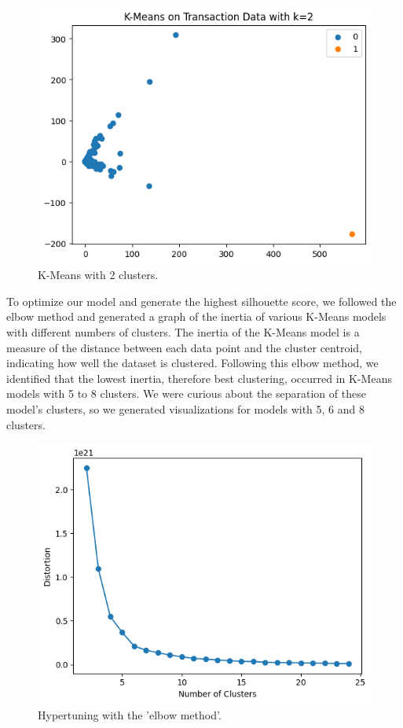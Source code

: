 \documentclass[sigconf]{acmart}
\begin{document}
\begin{figure}[H]
    \centering
    \includegraphics[width=0.8\linewidth]{M6-k-2.png}
    \caption{K-Means with 2 clusters.}
    \label{fig:k2Clusters}
\end{figure}

To optimize our model and generate the highest silhouette score, we followed the elbow method and generated a graph of the inertia of various K-Means models with different numbers of clusters. The inertia of the K-Means model is a measure of the distance between each data point and the cluster centroid, indicating how well the dataset is clustered. Following this elbow method, we identified that the lowest inertia, therefore best clustering, occurred in K-Means models with 5 to 8 clusters. We were curious about the separation of these model’s clusters, so we generated visualizations for models with 5, 6 and 8 clusters.

\begin{figure}[H]
    \centering
    \includegraphics[width=0.8\linewidth]{M6-elbow.png}
    \caption{Hypertuning with the 'elbow method'.}
    \label{fig:ElbowMethod}
\end{figure}
\end{document}
